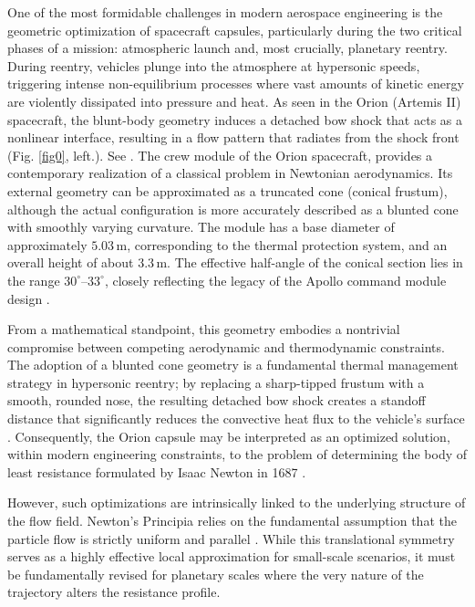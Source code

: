 \documentclass[a4paper,12pt]{amsart}
\theoremstyle{plain}
\theoremstyle{definition}
\begin{document}
One of the most formidable challenges in modern aerospace engineering is the geometric optimization of spacecraft capsules, particularly during the two critical phases of a mission: atmospheric launch and, most crucially, planetary reentry. During reentry, vehicles plunge into the atmosphere at hypersonic speeds, triggering intense non-equilibrium processes where vast amounts of kinetic energy are violently dissipated into pressure and heat.  As seen in the Orion (Artemis II) spacecraft, the blunt-body geometry induces a detached bow shock that acts as a nonlinear interface, resulting in a flow pattern that radiates from the shock front (Fig. \ref{fig0}, left.). See \cite{an,miele}. The crew module of the Orion spacecraft,   provides a contemporary realization of a classical problem in Newtonian aerodynamics. Its external geometry can be approximated  as a truncated cone (conical frustum), although the actual configuration is more accurately described as a blunted cone with smoothly varying curvature.  The module has a base diameter of approximately $5.03\,\mathrm{m}$, corresponding to the thermal protection system, and an overall height of about $3.3\,\mathrm{m}$. The effective half-angle of the conical section lies in the range $30^\circ$--$33^\circ$, closely reflecting the legacy of the Apollo command module design \cite{an,NASAOrion}.



From a mathematical standpoint, this geometry embodies a nontrivial compromise between competing aerodynamic and thermodynamic constraints. The adoption of a blunted cone geometry is a fundamental thermal management strategy in hypersonic reentry; by replacing a sharp-tipped frustum with a smooth, rounded nose, the resulting detached bow shock creates a standoff distance that significantly reduces the convective heat flux to the vehicle's surface \cite{ae,bertin,ha}. 
Consequently, the Orion capsule may be interpreted as an optimized solution, within modern engineering constraints, to the problem of determining the body of least resistance formulated by Isaac Newton in 1687 \cite{newton}. 

However, such optimizations are intrinsically linked to the underlying structure of the flow field.  Newton's Principia relies on the fundamental assumption that the particle flow is strictly uniform and parallel \cite{buttazzo, lachand, plakhov_book}. While this translational symmetry serves as a highly effective local approximation for small-scale scenarios, it must be fundamentally revised for planetary scales where the very nature of the trajectory alters the resistance profile.
\end{document}
